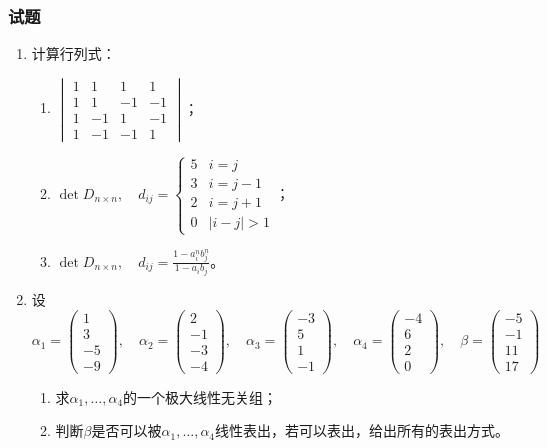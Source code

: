 \documentclass[a4paper,UTF8,fontset=windows]{ctexart}
\begin{document}
\subsubsection{试题}
\begin{enumerate}
    \item 计算行列式：
    \begin{enumerate}
        \item $\begin{vmatrix}1&1&1&1\\1&1&-1&-1\\1&-1&1&-1\\1&-1&-1&1\end{vmatrix}$；
        \item $\det D_{n\times n},\quad d_{ij}=\begin{cases}5&i=j\\3&i=j-1\\2&i=j+1\\0&|i-j|>1\end{cases}$；
        \item $\det D_{n\times n},\quad d_{ij}=\frac{1-a_i^nb_j^n}{1-a_ib_j}$。
    \end{enumerate}
    
    \item 设
    $$\alpha_1=\begin{pmatrix}1\\3\\-5\\-9\end{pmatrix},\quad\alpha_2=\begin{pmatrix}2\\-1\\-3\\-4\end{pmatrix},\quad\alpha_3=\begin{pmatrix}-3\\5\\1\\-1\end{pmatrix},\quad\alpha_4=\begin{pmatrix}-4\\6\\2\\0\end{pmatrix},\quad\beta=\begin{pmatrix}-5\\-1\\11\\17\end{pmatrix}$$
    \begin{enumerate}
        \item 求$\alpha_1,\dots,\alpha_4$的一个极大线性无关组；
        \item 判断$\beta$是否可以被$\alpha_1,\dots,\alpha_4$线性表出，若可以表出，给出所有的表出方式。
    \end{enumerate}


\end{enumerate}
\end{document}
